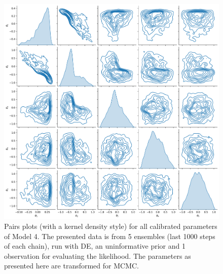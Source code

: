 \begin{figure}[ht]
\centering
\includegraphics[width=1.0\linewidth]{Figures/appendix_figs/kde_model4_DE.png}
\caption{Pairs plots (with a kernel density style) for all calibrated parameters of Model 4. The presented data is from 5 ensembles (last 1000 steps of each chain), run with DE, an uninformative prior and 1 observation for evaluating the likelihood. The parameters as presented here are transformed for MCMC.}\label{fig_kde_model4_DE}
\end{figure}

